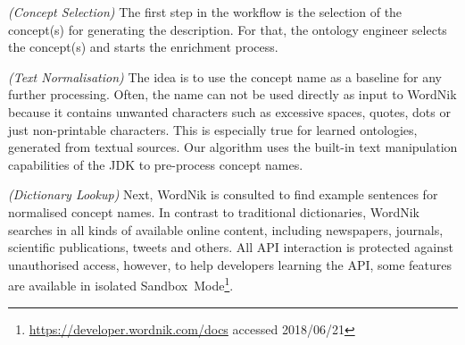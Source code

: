 \begin{enumerate}[label=\textbf{[Step \Roman*]},leftmargin=\widthof{[Step III]}+\labelsep]
	\item \emph{(Concept Selection)} The first step in the workflow is the selection of the concept(s)
	      for generating the description. For that, the ontology engineer selects the concept(s) and
		  starts the enrichment process. 
	\item \emph{(Text Normalisation)} The idea is to use the concept name as a baseline for any further
	      processing. Often, the name can not be used directly as input to WordNik because it
		  contains unwanted characters such as excessive spaces, quotes, dots or just non-printable
		  characters. This is especially true for learned ontologies, generated from textual sources.
		  Our algorithm uses the built-in text manipulation capabilities of the JDK to pre-process
		  concept names.
	\item \emph{(Dictionary Lookup)} Next, WordNik is consulted to find example sentences for normalised
	      concept names. In contrast to traditional dictionaries, WordNik searches in all kinds of available
		  online content, including newspapers, journals, scientific publications, tweets and others. All
		  API interaction is protected against unauthorised access, however, to help developers learning
		  the API, some features are available in isolated Sandbox~Mode\footnote{\url{https://developer.wordnik.com/docs} accessed  2018/06/21}.
		  

\end{enumerate}
